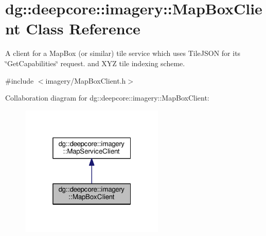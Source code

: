 \hypertarget{classdg_1_1deepcore_1_1imagery_1_1_map_box_client}{}\section{dg\+:\+:deepcore\+:\+:imagery\+:\+:Map\+Box\+Client Class Reference}
\label{classdg_1_1deepcore_1_1imagery_1_1_map_box_client}


A client for a Map\+Box (or similar) tile service which uses Tile\+J\+S\+ON for its \char`\"{}\+Get\+Capabilities\char`\"{} request. and X\+YZ tile indexing scheme.  




{\ttfamily \#include $<$imagery/\+Map\+Box\+Client.\+h$>$}



Collaboration diagram for dg\+:\+:deepcore\+:\+:imagery\+:\+:Map\+Box\+Client\+:
\nopagebreak
\begin{figure}[H]
\begin{center}
\leavevmode
\includegraphics[width=193pt]{classdg_1_1deepcore_1_1imagery_1_1_map_box_client__coll__graph}
\end{center}
\end{figure}
